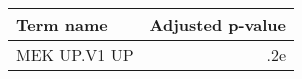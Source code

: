 \begin{tabular}{lr}
\toprule
   Term name &  Adjusted p-value \\
\midrule
MEK UP.V1 UP &               .2e \\
\bottomrule
\end{tabular}
